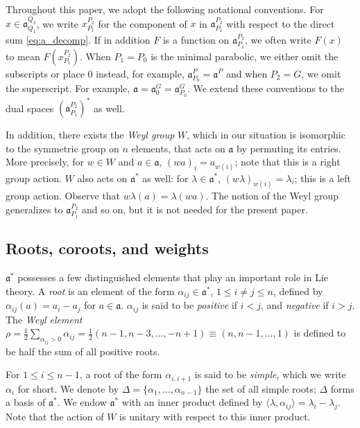 \documentclass[11pt]{amsart}
\numberwithin{theorem}{section}
\numberwithin{equation}{section}
\theoremstyle{remark}
\theoremstyle{definition}
\newcommand{\ga}{\mathfrak{a}}
\begin{document}
Throughout this paper, we adopt the following notational conventions. For $x \in \ga_{Q_1}^{Q_2}$, we write $x_{P_1}^{P_2}$ for the component of $x$ in $\ga_{P_1}^{P_2}$ with respect to the direct sum \eqref{eq:a_decomp}. If in addition $F$ is a function on $\ga_{P_1}^{P_2}$, we often write $F(x)$ to mean $F(x_{P_1}^{P_2})$.
When $P_1=P_0$ is the minimal parabolic, we either omit the subscripts or place $0$ instead, for example, $\ga_{P_0}^P=\ga^P$ and when $P_2=G$, we omit the superscript. For example, $\ga = \ga_{0}^G = \ga_{P_0}^G$. We extend these conventions to the dual spaces $(\ga_{P_1}^{P_2})^*$ as well.

In addition, there exists the \emph{Weyl group} $W$, which in our situation is isomorphic to the symmetric group on $n$ elements, that acts on $\ga$ by permuting its entries. More precisely, for $w \in W$ and $a \in \ga$, $(wa)_i = a_{w(i)}$; note that this is a right group action. $W$ also acts on $\ga^*$ as well: 
for $\lambda \in \ga^*$, $(w\lambda)_{w(i)} = \lambda_{i}$; this is a left group action. Observe that $w\lambda(a) = \lambda(wa)$. The notion of the Weyl group generalizes to $\ga_{P_1}^{P_2}$ and so on, but it is not needed for the present paper.


\subsection{Roots, coroots, and weights}

$\ga^*$ possesses a few distinguished elements that play an important role in Lie theory. A \emph{root} is an element of the form $\alpha_{ij} \in \ga^*$, $1 \leq i \neq j \leq n$, defined by $\alpha_{ij}(a) = a_i-a_j$ for $a \in \ga$. $\alpha_{ij}$ is said to be \emph{positive} if $i < j$, and \emph{negative} if $i > j$. The \emph{Weyl element} $\rho=\frac{1}{2}\sum_{\alpha_{ij}>0}\alpha_{ij} =\frac{1}{2}(n-1, n-3,\ldots, -n+1)\equiv (n,n-1,\ldots,1)$ is defined to be half the sum of all positive roots.


For $1 \leq i \leq n-1$, a root of the form $\alpha_{i,i+1}$ is said to be \emph{simple}, which we write $\alpha_i$ for short. We denote by $\Delta = \{\alpha_1, \ldots, \alpha_{n-1}\}$ the set of all simple roots; $\Delta$ forms a basis of $\ga^*$. We endow $\ga^*$ with an inner product defined by $\langle \lambda, \alpha_{ij} \rangle = \lambda_i - \lambda_j$. Note that the action of $W$ is unitary with respect to this inner product.
\end{document}

